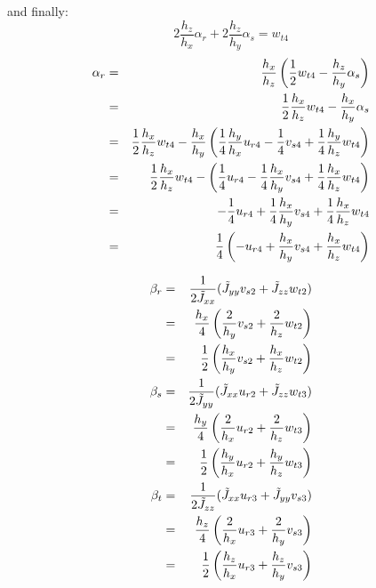 and finally:
\[
2 \frac{h_z}{h_x} \alpha_r + 2 \frac{h_z}{h_y} \alpha_s = w_{t4}
\]
\begin{eqnarray}
\alpha_r 
&=& \frac{h_x}{h_z} \left(\frac12 w_{t4} -  \frac{h_z}{h_y} \alpha_s\right) \nonumber\\
&=& \frac12 \frac{h_x}{h_z} w_{t4} - \frac{h_x}{h_y} \alpha_s \nonumber \\
&=& \frac12 \frac{h_x}{h_z} w_{t4} - \frac{h_x}{h_y} \left(
\frac14 \frac{h_y}{h_x} u_{r4} - \frac14 v_{s4} + \frac14 \frac{h_y}{h_z} w_{t4}  \right)\nonumber \\
&=& \frac12 \frac{h_x}{h_z} w_{t4} -  \left(
\frac14  u_{r4} - \frac14 \frac{h_x}{h_y}v_{s4} + \frac14 \frac{h_x}{h_z} w_{t4}  \right)\nonumber \\
&=& -\frac14 u_{r4} + \frac14 \frac{h_x}{h_y}v_{s4} + \frac14\frac{h_x}{h_z} w_{t4} \nonumber\\
&=& \frac14 \left( - u_{r4} +  \frac{h_x}{h_y}v_{s4} + \frac{h_x}{h_z} w_{t4}    \right) \nonumber
\end{eqnarray}


\begin{eqnarray}
\beta_r 
&=& \frac{1}{2 \tilde{J}_{xx}} ( \tilde{J}_{yy} v_{s2} + \tilde{J}_{zz} w_{t2} ) \nonumber\\
&=& \frac{h_x}{4} \left( \frac{2}{h_y} v_{s2} + \frac{2}{h_z} w_{t2} \right) \nonumber\\
&=& \frac{1}{2} \left( \frac{h_x}{h_y} v_{s2} + \frac{h_x}{h_z} w_{t2} \right) \nonumber\\
\beta_s 
&=& \frac{1}{2 \tilde{J}_{yy}} ( \tilde{J}_{xx} u_{r2} + \tilde{J}_{zz} w_{t3} ) \nonumber\\
&=& \frac{h_y}{4} \left(\frac{2}{h_x} u_{r2} + \frac{2}{h_z}  w_{t3} \right) \nonumber\\
&=& \frac{1}{2} \left(\frac{h_y}{h_x} u_{r2} + \frac{h_y}{h_z}  w_{t3} \right) \nonumber\\
\beta_t 
&=& \frac{1}{2 \tilde{J}_{zz}} ( \tilde{J}_{xx} u_{r3} + \tilde{J}_{yy} v_{s3} ) \nonumber\\
&=& \frac{h_z}{4} \left( \frac{2}{h_x} u_{r3} + \frac{2}{h_y}  v_{s3} \right) \nonumber\\
&=& \frac{1}{2} \left( \frac{h_z}{h_x} u_{r3} + \frac{h_z}{h_y}  v_{s3} \right) \nonumber
\end{eqnarray}


